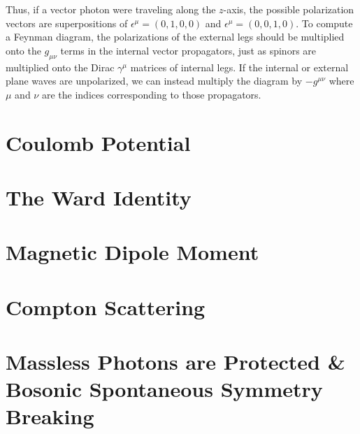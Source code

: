 Thus, if a vector photon were traveling along the $z$-axis, the possible polarization vectors are superpositions of $\epsilon^\mu = (0, 1, 0, 0)$ and $\epsilon^\mu = (0, 0, 1, 0)$. To compute a Feynman diagram, the polarizations of the external legs should be multiplied onto the $g_{\mu\nu}$ terms in the internal vector propagators, just as spinors are multiplied onto the Dirac $\gamma^\mu$ matrices of internal legs. If the internal or external plane waves are unpolarized, we can instead multiply the diagram by $-g^{\mu \nu}$ where $\mu$ and $\nu$ are the indices corresponding to those propagators.


\section{Coulomb Potential}

\section{The Ward Identity}

\section{Magnetic Dipole Moment}

\section{Compton Scattering}

\section{Massless Photons are Protected \& Bosonic Spontaneous Symmetry Breaking}